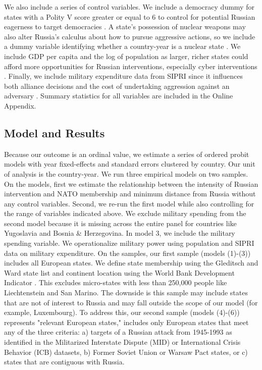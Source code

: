 \documentclass[bibtex, autowc]{apsr_submission}
\begin{document}
We also include a series of control variables. We include a democracy dummy for states with a Polity V score greater or equal to 6 to control for potential Russian eagerness to target democracies \citep{early_nuclearweaponsexistential_2018}. A state's possession of nuclear weapons may also alter Russia's calculus about how to pursue aggressive actions, so we include a dummy variable identifying whether a country-year is a nuclear state \citep{gartzke_strategicapproachnuclear_2009}. We include GDP per capita and the log of population as larger, richer states could afford more opportunities for Russian interventions, especially cyber interventions \citep{beckley_economicdevelopmentmilitary_2010}. Finally, we include military expenditure data from SIPRI since it influences both alliance decisions and the cost of undertaking aggression against an adversary \citep{omitoogun_militaryexpendituredata_2006}. Summary statistics for all variables are included in the Online Appendix.

\subsection{Model and Results}
Because our outcome is an ordinal value, we estimate a series of ordered probit models with year fixed-effects and standard errors clustered by country. Our unit of analysis is the country-year. We run three empirical models on two samples. On the models, first we estimate the relationship between the intensity of Russian intervention and NATO membership and minimum distance from Russia without any control variables. Second, we re-run the first model  while also controlling for the range of variables indicated above. We exclude military spending from the second model because it is missing across the entire panel for countries like Yugoslavia and Bosnia \& Herzegovina. In model 3, we include the military spending variable. We operationalize military power using population and SIPRI data on military expenditure. On the samples, our first sample (models (1)-(3)) includes all European states. We define state membership using the Gleditsch and Ward state list and continent location using the World Bank Development Indicator \citep{gleditsch_revisedlistindependent_1999}. This excludes micro-states with less than 250,000 people like Liechtenstein and San Marino. The downside is this sample may include states that are not of interest to Russia and may fall outside the scope of our model (for example, Luxembourg). To address this, our second sample (models (4)-(6)) represents "relevant European states," includes only European states that meet any of the three criteria: a) targets of a Russian attack from 1945-1993 as identified in the Militarized Interstate Dispute (MID) or International Crisis Behavior (ICB) datasets, b) Former Soviet Union or Warsaw Pact states, or c) states that are contiguous with Russia.
\end{document}

